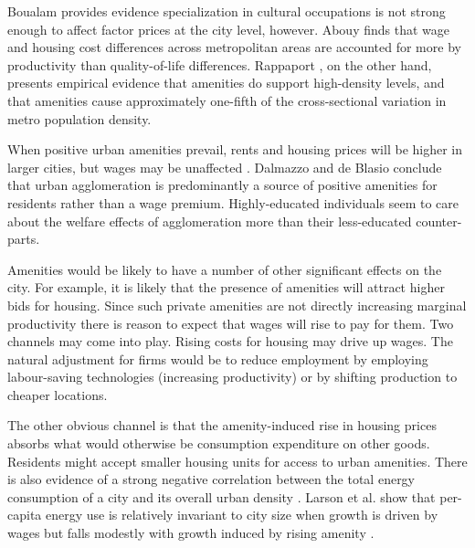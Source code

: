 Boualam \cite{boualamDoesCultureAffect2014} provides evidence specialization in cultural occupations is not strong enough to affect factor prices at the city level, however. Abouy \cite{albouyWhatAreCities2016} finds that wage and housing cost differences across metropolitan areas are accounted for more by productivity than quality-of-life differences. Rappaport \cite{rappaportConsumptionAmenitiesCity2008}, on the other hand, presents empirical evidence  that amenities do support high-density levels, and that amenities  cause approximately one-fifth of the cross-sectional variation in metro population density. 

When positive urban amenities prevail, rents and housing prices will be higher in larger cities, but wages may be unaffected \cite{robackWagesRentsAmenities1988, dalmazzoAmenitiesSkillbiasedAgglomeration2011}. Dalmazzo and  de Blasio\cite{dalmazzoAmenitiesSkillbiasedAgglomeration2011} conclude that urban agglomeration is predominantly a source of positive amenities for residents rather than a wage premium. Highly-educated individuals seem to care about the welfare effects of agglomeration more than their less-educated counter-parts. 


Amenities would be likely to have a number of other significant effects on the city. For example, it is likely that the presence of amenities will attract higher bids for housing. Since such private amenities are not directly increasing marginal productivity there is reason to expect that wages will rise to pay for them. Two channels may come into play. Rising costs for housing may drive up wages. The natural adjustment for firms would be to reduce employment by employing labour-saving technologies (increasing productivity) or by shifting production to cheaper locations.  

The other obvious channel is that the amenity-induced rise in housing prices absorbs what would otherwise be consumption expenditure on other goods. Residents might accept smaller housing units for access to urban amenities. There is also evidence of a strong negative correlation between the total energy consumption of a city and its overall urban density \cite{NewmanPeterJeffrey}. Larson et al. show that per-capita energy use is relatively invariant to city size when growth is driven by wages but falls modestly with growth induced by rising amenity \cite{GET-REF}.

